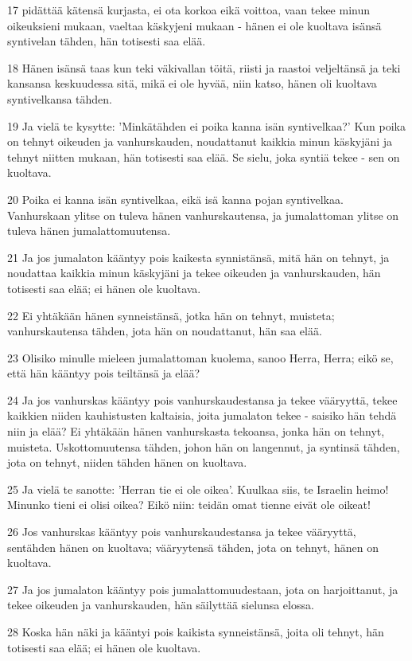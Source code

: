 \par 17 pidättää kätensä kurjasta, ei ota korkoa eikä voittoa, vaan tekee minun oikeuksieni mukaan, vaeltaa käskyjeni mukaan - hänen ei ole kuoltava isänsä syntivelan tähden, hän totisesti saa elää.
\par 18 Hänen isänsä taas kun teki väkivallan töitä, riisti ja raastoi veljeltänsä ja teki kansansa keskuudessa sitä, mikä ei ole hyvää, niin katso, hänen oli kuoltava syntivelkansa tähden.
\par 19 Ja vielä te kysytte: 'Minkätähden ei poika kanna isän syntivelkaa?' Kun poika on tehnyt oikeuden ja vanhurskauden, noudattanut kaikkia minun käskyjäni ja tehnyt niitten mukaan, hän totisesti saa elää. Se sielu, joka syntiä tekee - sen on kuoltava.
\par 20 Poika ei kanna isän syntivelkaa, eikä isä kanna pojan syntivelkaa. Vanhurskaan ylitse on tuleva hänen vanhurskautensa, ja jumalattoman ylitse on tuleva hänen jumalattomuutensa.
\par 21 Ja jos jumalaton kääntyy pois kaikesta synnistänsä, mitä hän on tehnyt, ja noudattaa kaikkia minun käskyjäni ja tekee oikeuden ja vanhurskauden, hän totisesti saa elää; ei hänen ole kuoltava.
\par 22 Ei yhtäkään hänen synneistänsä, jotka hän on tehnyt, muisteta; vanhurskautensa tähden, jota hän on noudattanut, hän saa elää.
\par 23 Olisiko minulle mieleen jumalattoman kuolema, sanoo Herra, Herra; eikö se, että hän kääntyy pois teiltänsä ja elää?
\par 24 Ja jos vanhurskas kääntyy pois vanhurskaudestansa ja tekee vääryyttä, tekee kaikkien niiden kauhistusten kaltaisia, joita jumalaton tekee - saisiko hän tehdä niin ja elää? Ei yhtäkään hänen vanhurskasta tekoansa, jonka hän on tehnyt, muisteta. Uskottomuutensa tähden, johon hän on langennut, ja syntinsä tähden, jota on tehnyt, niiden tähden hänen on kuoltava.
\par 25 Ja vielä te sanotte: 'Herran tie ei ole oikea'. Kuulkaa siis, te Israelin heimo! Minunko tieni ei olisi oikea? Eikö niin: teidän omat tienne eivät ole oikeat!
\par 26 Jos vanhurskas kääntyy pois vanhurskaudestansa ja tekee vääryyttä, sentähden hänen on kuoltava; vääryytensä tähden, jota on tehnyt, hänen on kuoltava.
\par 27 Ja jos jumalaton kääntyy pois jumalattomuudestaan, jota on harjoittanut, ja tekee oikeuden ja vanhurskauden, hän säilyttää sielunsa elossa.
\par 28 Koska hän näki ja kääntyi pois kaikista synneistänsä, joita oli tehnyt, hän totisesti saa elää; ei hänen ole kuoltava.
